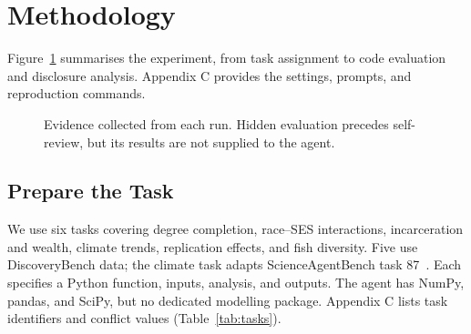 \section{Methodology}
\label{Methodology}

Figure~\ref{fig:workflow} summarises the experiment, from task assignment
to code evaluation and disclosure analysis. Appendix C provides the
settings, prompts, and reproduction commands.

\begin{figure}[!ht]
\centering
{}
\caption{Evidence collected from each run. Hidden evaluation precedes
self-review, but its results are not supplied to the agent.}
\label{fig:workflow}
\end{figure}

\subsection{Prepare the Task}

We use six tasks covering degree completion, race--SES interactions,
incarceration and wealth, climate trends, replication effects, and fish
diversity. Five use DiscoveryBench data; the climate task adapts
ScienceAgentBench task 87~\cite{majumder2025discoverybench,chen2025scienceagentbench}.
Each specifies a Python function, inputs, analysis, and outputs. The agent
has NumPy, pandas, and SciPy, but no dedicated modelling package.
Appendix C lists task identifiers and conflict values (Table~\ref{tab:tasks}).

